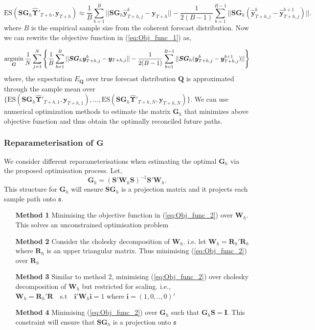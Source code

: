 \documentclass[12pt]{article}
\theoremstyle{definition}
\begin{document}
\begin{equation}\label{eq:ES_with_Samplespaths}
\text{ES}(\bm{SG}_h\hat{\bm{\Upsilon}}'_{T+h}, \bm{y}_{T+h}) \approx \frac{1}{B}\sum_{b=1}^{B}||\bm{SG}_h\hat{\bm{y}}_{T+h,j}^b -\bm{y}_{T+h}||-\frac{1}{2(B-1)}\sum_{b=1}^{B-1}||\bm{SG}_h(\hat{\bm{y}}_{T+h,j}^b -\hat{\bm{y}}_{T+h,j}^{b+1})||.
\end{equation}
where $B$ is the empirical sample size from the coherent forecast distribution. Now we can rewrite the objective function in (\ref{eq:Obj_func_1}) as,

\begin{equation}\label{eq:Obj_func_2}
\operatornamewithlimits{argmin}_{\bm{G}} \frac{1}{N}\sum_{j=1}^{N}\left\{\frac{1}{B}\sum_{b=1}^{B}||\bm{SG}_h\bm{y}_{T+h,j}^b -\bm{y}_{T+h,j}||-\frac{1}{2(B-1)}\sum_{b=1}^{B-1}||\bm{SG}_h(\bm{y}_{T+h,j}^b -\bm{y}_{T+h,j}^{b+1})||\right\}
\end{equation}
where, the expectation $E_{\bm{Q}}$ over true forecast distribution $\bm{Q}$ is approximated through the sample mean over $\{\text{ES}(\bm{SG}_h\hat{\bm{\Upsilon}}'_{T+h,1}, \bm{y}_{T+h,1}),...,\text{ES}(\bm{SG}_h\hat{\bm{\Upsilon}}'_{T+h,N}, \bm{y}_{T+h,N})\}$.   
We can use numerical optimization methods to estimate the matrix $\bm{G}_h$ that minimizes above objective function and thus obtain the optimally reconciled future paths. 

\subsubsection{Reparameterisation of $\bm{G}$ }\label{subsubsec:ReparameterisationG}

We consider different reparameterisations when estimating the optimal $\bm{G}_h$ via the proposed optimisation process. Let,  
\begin{equation}\label{eq:StructureofG}
\bm{G}_h = (\bm{S'W}_h\bm{S})^{-1}\bm{S'W}_h.
\end{equation}
This structure for $\bm{G}_h$ will ensure $\bm{SG}_h$ is a projection matrix and it projects each sample path onto $\mathfrak{s}$. 
\begin{itemize}
	\item[\textbf{Method 1}] Minimising the objective function in (\ref{eq:Obj_func_2}) over $\bm{W}_h$. This solves an unconstrained optimisation problem 
	\item[\textbf{Method 2}] Consider the cholesky decomposition of $\bm{W}_h$. i.e. let $\bm{W}_h = \bm{R}_h'\bm{R}_h$ where $\bm{R}_h$ is an upper triangular matrix. Thus minimising  (\ref{eq:Obj_func_2}) over $\bm{R}_h$ 
	\item[\textbf{Method 3}] Similar to method 2, minimising (\ref{eq:Obj_func_2}) over cholesky decomposition of $\bm{W}_h$ but restricted for scaling. i.e., $\bm{W}_h=\bm{R}_h'\bm{R} \quad \text{s.t} \quad \bm{i'}\bm{W}_h\bm{i}=1$ where $\bm{i}=(1,0,..,0)'$
	\item[\textbf{Method 4}] Minimising (\ref{eq:Obj_func_2}) over $\bm{G}_h$ such that $\bm{G}_h\bm{S}=\bm{I}$. This constraint will ensure that $\bm{SG}_h$ is a projection onto $\mathfrak{s}$
	  
\end{itemize}    
\end{document}
